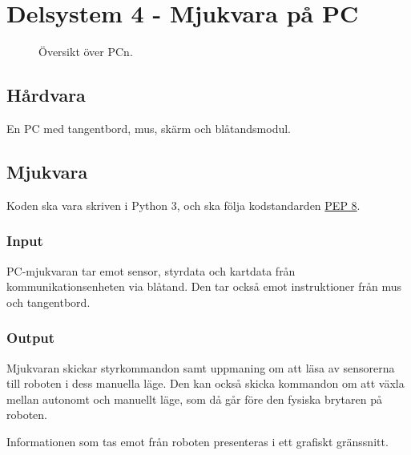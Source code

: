 \documentclass[a4paper,11pt]{article}
\begin{document}
\section{Delsystem 4 - Mjukvara på PC} \label{sec:system4}
\begin{figure}[h!]
    \caption{Översikt över PCn.}
    \label{fig:modules}
\end{figure}
\subsection{Hårdvara}
En PC med tangentbord, mus, skärm och blåtandsmodul.

\subsection{Mjukvara}

Koden ska vara skriven i Python 3, och ska följa kodstandarden \href{https://www.python.org/dev/peps/pep-0008/}{PEP 8}.

\subsubsection{Input}
PC-mjukvaran tar emot sensor, styrdata och kartdata från kommunikationsenheten via blåtand. Den tar också emot instruktioner från mus och tangentbord. 

\subsubsection{Output}
Mjukvaran skickar styrkommandon samt uppmaning om att läsa av sensorerna till roboten i dess manuella läge. Den kan också skicka kommandon om att växla mellan autonomt och manuellt läge, som då går före den fysiska brytaren på roboten.

Informationen som tas emot från roboten presenteras i ett grafiskt gränssnitt.
\end{document}
